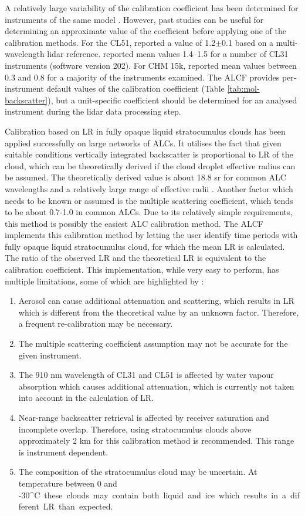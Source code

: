A relatively large variability of the calibration coefficient has been determined
for instruments of the same model \citep{hopkin2019}. However, past studies
can be useful for determining an approximate value of the coefficient
before applying one of the calibration methods. For the CL51, \cite{jin2015}
reported a value of 1.2$\pm$0.1 based on a multi-wavelength lidar reference.
\cite{hopkin2019} reported mean values 1.4--1.5 for a number of CL31 instruments
(software version 202). For CHM 15k, \cite{hopkin2019} reported mean values
between 0.3 and 0.8 for a majority of the instruments examined. The ALCF provides
per-instrument default values of the calibration coefficient
(Table \ref{tab:mol-backscatter}), but a unit-specific coefficient should be determined
for an analysed instrument during the lidar data processing step.

Calibration based on LR in fully opaque liquid stratocumulus clouds
has been applied successfully on large networks of ALCs. It utilises the
fact that given suitable conditions vertically integrated backscatter is
proportional to LR of the cloud, which can be theoretically derived
if the cloud droplet effective radius can be assumed. The theoretically derived
value is about 18.8 sr for common ALC wavelengths and a relatively large
range of effective radii \citep{oconnor2004}. Another factor which needs to be known or assumed
is the multiple scattering coefficient, which tends to be about 0.7-1.0 in common
ALCs. Due to its relatively simple requirements, this method is possibly the
easiest ALC calibration method. The ALCF implements this calibration method by
letting the user identify time periods with fully opaque liquid stratocumulus cloud,
for which the mean LR is calculated. The ratio of the observed LR and
the theoretical LR is equivalent to the calibration coefficient. This implementation,
while very easy to perform, has multiple limitations, some of which are
highlighted by \cite{hopkin2019}:

\begin{enumerate}
\item Aerosol can cause additional attenuation and
scattering, which results in LR which is different from the theoretical
value by an unknown factor. Therefore, a frequent re-calibration may be
necessary.
\item The multiple scattering coefficient assumption may not be accurate for the given
instrument.
\item The 910 nm wavelength of CL31 and CL51 is affected by water vapour
absorption which causes additional attenuation, which is currently not taken
into account in the calculation of LR.
\item Near-range backscatter retrieval is affected by receiver saturation
and incomplete overlap. Therefore, using stratocumulus clouds above
approximately 2 km for this calibration method is recommended. This range
is instrument dependent.
\item The composition of the stratocumulus cloud may be uncertain.
At temperature between 0 and -30\unit{^\circ C} these clouds may contain both liquid and ice
which results in a different LR than expected.
\end{enumerate}

